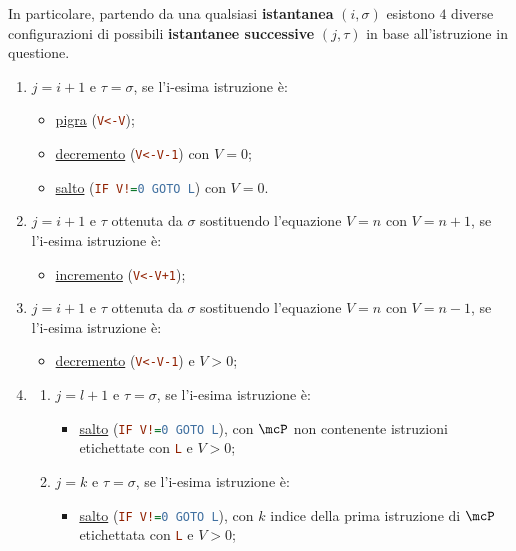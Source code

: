 In particolare, partendo da una qualsiasi \textbf{istantanea} \((i,\sigma)\) esistono \(4\) diverse configurazioni di possibili \textbf{istantanee successive} \((j,\tau)\) in base all'istruzione in questione.
\begin{enumerate}
  \item \(j=i+1\) e \(\tau = \sigma\), se l'i-esima istruzione è:
  \begin{itemize}
    \item \underline{pigra} (\lstinline[language=ini]{V<-V});
    \item \underline{decremento} (\lstinline[language=ini]{V<-V-1}) con \(V=0\);
    \item \underline{salto} (\lstinline[language=ini]{IF V!=0 GOTO L}) con \(V=0\).
  \end{itemize}
  \item \(j=i+1\) e \(\tau\) ottenuta da \(\sigma\) sostituendo l'equazione \(V=n\) con \(V=n+1\), se l'i-esima istruzione è:
  \begin{itemize}
    \item \underline{incremento} (\lstinline[language=ini]{V<-V+1});
  \end{itemize}
  \item \(j=i+1\) e \(\tau\) ottenuta da \(\sigma\) sostituendo l'equazione \(V=n\) con \(V=n-1\), se l'i-esima istruzione è:
  \begin{itemize}
    \item \underline{decremento} (\lstinline[language=ini]{V<-V-1}) e \(V>0\);
  \end{itemize}
  \item \begin{enumerate}
          \item \(j=l+1\) e \(\tau = \sigma\), se l'i-esima istruzione è:
          \begin{itemize}
            \item \underline{salto} (\lstinline[language=ini]{IF V!=0 GOTO L}), con \(\mcP\) non contenente istruzioni etichettate con \lstinline[language=ini]{L} e \(V>0\);
          \end{itemize}
          \item \(j=k\) e \(\tau = \sigma\), se l'i-esima istruzione è:
          \begin{itemize}
            \item \underline{salto} (\lstinline[language=ini]{IF V!=0 GOTO L}), con \(k\) indice della prima istruzione di \(\mcP\) etichettata con \lstinline[language=ini]{L} e \(V>0\);
          \end{itemize}
        \end{enumerate}
\end{enumerate}

